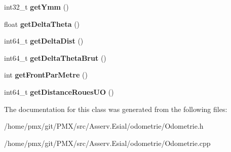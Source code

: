 \begin{DoxyCompactItemize}
int32\+\_\+t {\bfseries get\+Ymm} ()
\item 
\mbox{\label{classOdometrie_aa528fd785ccf2f4faa6cfc1ad8d5916f}} 
float {\bfseries get\+Delta\+Theta} ()
\item 
\mbox{\label{classOdometrie_a41602c3f4da53800fde1604c87bb7ab6}} 
int64\+\_\+t {\bfseries get\+Delta\+Dist} ()
\item 
\mbox{\label{classOdometrie_a3a12ffc1a045e0623f9e7f45091af603}} 
int64\+\_\+t {\bfseries get\+Delta\+Theta\+Brut} ()
\item 
\mbox{\label{classOdometrie_a97f3023787b53a05f789770a56a791be}} 
int {\bfseries get\+Front\+Par\+Metre} ()
\item 
\mbox{\label{classOdometrie_a883791d5ea44c7d36d8e3ce3766164b4}} 
int64\+\_\+t {\bfseries get\+Distance\+Roues\+UO} ()
\end{DoxyCompactItemize}


The documentation for this class was generated from the following files\+:\begin{DoxyCompactItemize}
\item 
/home/pmx/git/\+P\+M\+X/src/\+Asserv.\+Esial/odometrie/Odometrie.\+h\item 
/home/pmx/git/\+P\+M\+X/src/\+Asserv.\+Esial/odometrie/Odometrie.\+cpp\end{DoxyCompactItemize}
